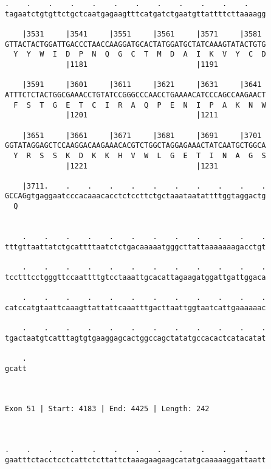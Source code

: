 \documentclass{article}
\begin{document}
\begin{Verbatim}
.    .    .    .    .    .    .    .    .    .    .    .    
tagaatctgtgttctgctcaatgagaagtttcatgatctgaatgttattttcttaaaagg
                                                            
    |3531     |3541     |3551     |3561     |3571     |3581 
GTTACTACTGGATTGACCCTAACCAAGGATGCACTATGGATGCTATCAAAGTATACTGTG
  Y  Y  W  I  D  P  N  Q  G  C  T  M  D  A  I  K  V  Y  C  D
              |1181                         |1191           
  
    |3591     |3601     |3611     |3621     |3631     |3641 
ATTTCTCTACTGGCGAAACCTGTATCCGGGCCCAACCTGAAAACATCCCAGCCAAGAACT
  F  S  T  G  E  T  C  I  R  A  Q  P  E  N  I  P  A  K  N  W
              |1201                         |1211           
  
    |3651     |3661     |3671     |3681     |3691     |3701 
GGTATAGGAGCTCCAAGGACAAGAAACACGTCTGGCTAGGAGAAACTATCAATGCTGGCA
  Y  R  S  S  K  D  K  K  H  V  W  L  G  E  T  I  N  A  G  S
              |1221                         |1231           
  
    |3711.    .    .    .    .    .    .    .    .    .    .
GCCAGgtgaggaatcccacaaacacctctccttctgctaaataatattttggtaggactg
  Q                                                         
                                                            
  
    .    .    .    .    .    .    .    .    .    .    .    .
tttgttaattatctgcattttaatctctgacaaaaatgggcttattaaaaaaagacctgt
                                                            
    .    .    .    .    .    .    .    .    .    .    .    .
tcctttcctgggttccaattttgtcctaaattgcacattagaagatggattgattggaca
                                                            
    .    .    .    .    .    .    .    .    .    .    .    .
catccatgtaattcaaagttattattcaaatttgacttaattggtaatcattgaaaaaac
                                                            
    .    .    .    .    .    .    .    .    .    .    .    .
tgactaatgtcatttagtgtgaaggagcactggccagctatatgccacactcatacatat
                                                            
    .
gcatt
     
     
 
Exon 51 | Start: 4183 | End: 4425 | Length: 242



.    .    .    .    .    .    .    .    .    .    .    .    
gaatttctacctcctcattctcttattctaaagaagaagcatatgcaaaaaggattaatt
                                                            

\end{Verbatim}
\end{document}
